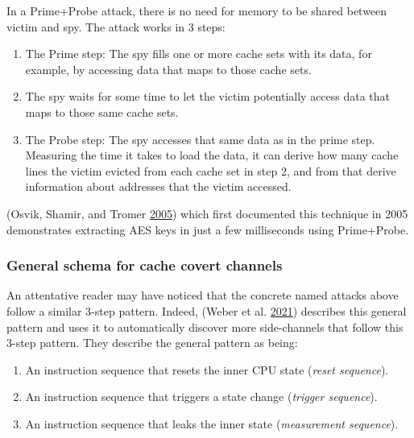 \documentclass[a4paper,]{report}
\providecommand{\tightlist}{%
  \setlength{\itemsep}{0pt}\setlength{\parskip}{0pt}}
\begin{document}
In a Prime+Probe attack, there is no need for memory
to be shared between victim and spy. The attack works in 3 steps:

\begin{enumerate}
\def\labelenumi{\arabic{enumi}.}
\tightlist
\item
  The Prime step: The spy fills one or more cache sets with its data,
  for example, by accessing data that maps to those cache sets.
\item
  The spy waits for some time to let the victim potentially access data
  that maps to those same cache sets.
\item
  The Probe step: The spy accesses that same data as in the prime step.
  Measuring the time it takes to load the data, it can derive how many
  cache lines the victim evicted from each cache set in step 2, and from
  that derive information about addresses that the victim accessed.
\end{enumerate}

(Osvik, Shamir, and Tromer \protect\hyperlink{ref-Osvik2005}{2005})
which first documented this technique in 2005 demonstrates extracting
AES keys in just a few milliseconds using Prime+Probe.

\hypertarget{general-schema-for-cache-covert-channels}{%
\subsubsection{General schema for cache covert
channels}\label{general-schema-for-cache-covert-channels}}

An attentative reader may have noticed that the concrete named attacks
above follow a similar 3-step pattern. Indeed, (Weber et al.
\protect\hyperlink{ref-Weber2021}{2021}) describes this general pattern
and uses it to automatically discover more side-channels that follow
this 3-step pattern. They describe the general pattern as being:

\begin{enumerate}
\def\labelenumi{\arabic{enumi}.}
\tightlist
\item
  An instruction sequence that resets the inner CPU state (\emph{reset
  sequence}).
\item
  An instruction sequence that triggers a state change (\emph{trigger
  sequence}).
\item
  An instruction sequence that leaks the inner state (\emph{measurement
  sequence}).
\end{enumerate}
\end{document}
